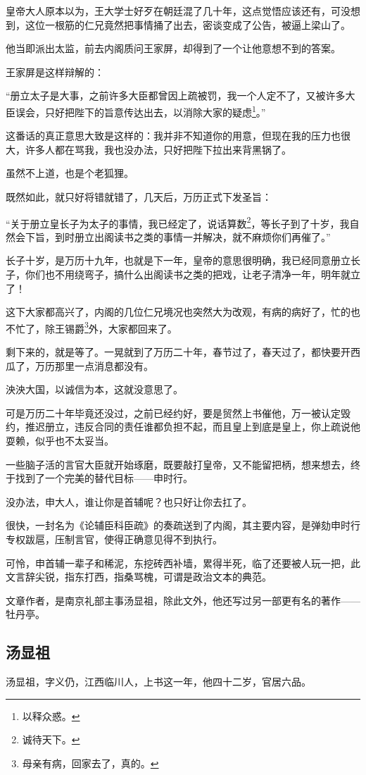 \begin{multicols}{\theparacolNo}
皇帝大人原本以为，王大学士好歹在朝廷混了几十年，这点觉悟应该还有，可没想到，这位一根筋的仁兄竟然把事情捅了出去，密谈变成了公告，被逼上梁山了。

他当即派出太监，前去内阁质问王家屏，却得到了一个让他意想不到的答案。

王家屏是这样辩解的：

“册立太子是大事，之前许多大臣都曾因上疏被罚，我一个人定不了，又被许多大臣误会，只好把陛下的旨意传达出去，以消除大家的疑虑\footnote{以释众惑。}。”

这番话的真正意思大致是这样的：我并非不知道你的用意，但现在我的压力也很大，许多人都在骂我，我也没办法，只好把陛下拉出来背黑锅了。

虽然不上道，也是个老狐狸。

既然如此，就只好将错就错了，几天后，万历正式下发圣旨：

“关于册立皇长子为太子的事情，我已经定了，说话算数\footnote{诚待天下。}，等长子到了十岁，我自然会下旨，到时册立出阁读书之类的事情一并解决，就不麻烦你们再催了。”

长子十岁，是万历十九年，也就是下一年，皇帝的意思很明确，我已经同意册立长子，你们也不用绕弯子，搞什么出阁读书之类的把戏，让老子清净一年，明年就立了！

这下大家都高兴了，内阁的几位仁兄境况也突然大为改观，有病的病好了，忙的也不忙了，除王锡爵\footnote{母亲有病，回家去了，真的。}外，大家都回来了。

剩下来的，就是等了。一晃就到了万历二十年，春节过了，春天过了，都快要开西瓜了，万历那里一点消息都没有。

泱泱大国，以诚信为本，这就没意思了。

可是万历二十年毕竟还没过，之前已经约好，要是贸然上书催他，万一被认定毁约，推迟册立，违反合同的责任谁都负担不起，而且皇上到底是皇上，你上疏说他耍赖，似乎也不太妥当。

一些脑子活的言官大臣就开始琢磨，既要敲打皇帝，又不能留把柄，想来想去，终于找到了一个完美的替代目标——申时行。

没办法，申大人，谁让你是首辅呢？也只好让你去扛了。

很快，一封名为《论辅臣科臣疏》的奏疏送到了内阁，其主要内容，是弹劾申时行专权跋扈，压制言官，使得正确意见得不到执行。

可怜，申首辅一辈子和稀泥，东挖砖西补墙，累得半死，临了还要被人玩一把，此文言辞尖锐，指东打西，指桑骂槐，可谓是政治文本的典范。

文章作者，是南京礼部主事汤显祖，除此文外，他还写过另一部更有名的著作——牡丹亭。

\subsection{汤显祖}
汤显祖，字义仍，江西临川人，上书这一年，他四十二岁，官居六品。


\end{multicols}
